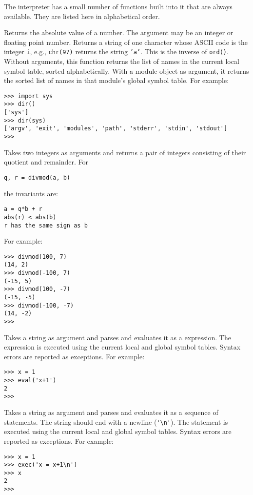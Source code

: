 The {\Python} interpreter has a small number of functions built into it that
are always available.
They are listed here in alphabetical order.
\begin{description}
Returns the absolute value of a number.
The argument may be an integer or floating point number.
Returns a string of one character
whose ASCII code is the integer {\tt i},
e.g., {\tt chr(97)} returns the string {\tt 'a'}.
This is the inverse of {\tt ord()}.
Without arguments, this function returns the list of names in the
current local symbol table, sorted alphabetically.
With a module object as argument, it returns the sorted list of names in
that module's global symbol table.
For example:
\bcode\begin{verbatim}
>>> import sys
>>> dir()
['sys']
>>> dir(sys)
['argv', 'exit', 'modules', 'path', 'stderr', 'stdin', 'stdout']
>>> 
\end{verbatim}\ecode
{}
Takes two integers as arguments and returns a pair of integers
consisting of their quotient and remainder.
For
\bcode\begin{verbatim}
q, r = divmod(a, b)
\end{verbatim}\ecode
the invariants are:
\bcode\begin{verbatim}
a = q*b + r
abs(r) < abs(b)
r has the same sign as b
\end{verbatim}\ecode
For example:
\bcode\begin{verbatim}
>>> divmod(100, 7)
(14, 2)
>>> divmod(-100, 7)
(-15, 5)
>>> divmod(100, -7)
(-15, -5)
>>> divmod(-100, -7)
(14, -2)
>>> 
\end{verbatim}\ecode
{}
Takes a string as argument and parses and evaluates it as a {\Python}
expression.
The expression is executed using the current local and global symbol
tables.
Syntax errors are reported as exceptions.
For example:
\bcode\begin{verbatim}
>>> x = 1
>>> eval('x+1')
2
>>> 
\end{verbatim}\ecode
{}
Takes a string as argument and parses and evaluates it as a sequence of
{\Python} statements.
The string should end with a newline (\verb"'\n'").
The statement is executed using the current local and global symbol
tables.
Syntax errors are reported as exceptions.
For example:
\bcode\begin{verbatim}
>>> x = 1
>>> exec('x = x+1\n')
>>> x
2
>>> 
\end{verbatim}\ecode
{}

\end{description}
